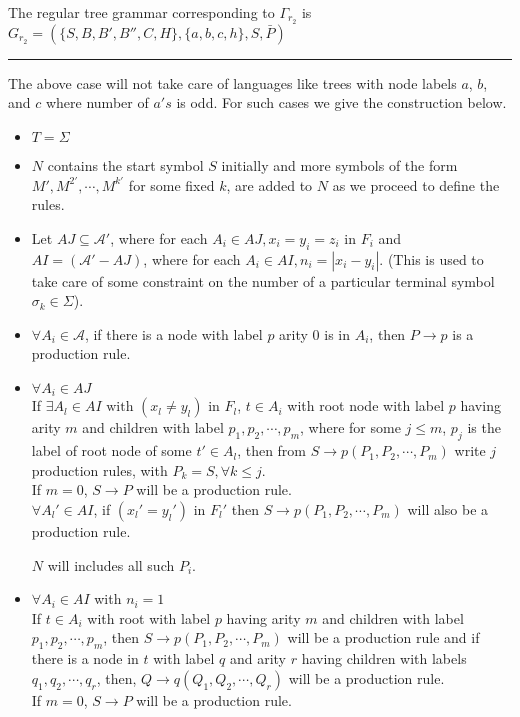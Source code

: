 \begin{example}
   The regular tree grammar corresponding to $\Gamma _{r_2}$ is    $G_{r_2}=(\{S,B,B',B'',C,H\},\{a,b,c,h\},S,\bar{P})$\\
\noindent \rule{\textwidth}{1pt}
\end{example}    


The above case will not take care of languages like trees with node labels $a$, $b$, and $c$ where number of $a's$ is odd. For such cases we 
give the construction below.
\begin{itemize}
	\item $T=\Sigma$
	\item $N$ contains the start symbol  $S$ initially and more symbols of the form $M',M^{2'},\cdots , M^{k'}$ for some fixed $k$, are added to $N$ 
		as we proceed to define the rules. 
	\item Let $AJ\subseteq \mathcal{A}'$, where for each $A_i \in AJ, x_i=y_i=z_i \mbox{ in }F_i$ and 
		$AI= (\mathcal{A}'-AJ)$, where for each $A_i\in AI,$\hbox{$ n_i=|x_i-y_i|.$} (This is used to take care of some constraint on the number of 
		a particular terminal symbol $\sigma_k\in \Sigma$).
	\item $\forall A_i\in \mathcal{A}$, if there is a node with label $p$ arity 0 is in $A_i$, then \hbox{$P\rightarrow p$} is a production rule.
	\item $\forall A_i\in AJ$\\
		If  $\exists A_l\in AI\mbox{ with }(x_l\neq y_l)\mbox{ in } F_l$, $t\in A_i$ with root node with label $p$ 
		having arity $m$ and children with label 
		$p_1,p_2,\cdots ,p_{m}$, where for  some $j\leq m$, $p_j$ is the label of root node of some $t'\in A_l$, then from 
		\hbox{$S\rightarrow p(P_1,P_2,\cdots ,P_m)$}  write  $j$ production rules, with $P_k=S,\forall k\leq j$.\\
		If $m=0$, \hbox{$S\rightarrow P$} will be a production rule.\\

		$\forall A_l'\in AI$, if $(x_l'= y_l')\mbox{ in }F_l'$ then \hbox{$S\rightarrow p(P_1,P_2,\cdots ,P_m)$} will also be a production rule.

		$N$ will includes all such $P_i$.

	\item $\forall A_i\in AI$ with $n_i=1$\\
		If $t\in A_i$ with root with label $p$ having arity $m$ and children with label $p_1,p_2,\cdots ,p_m$, 
		then \hbox{$S\rightarrow p(P_1,P_2,\cdots ,P_m)$} 
		will be a production rule and  if there is a node in $t$ with label $q$ and arity $r$  having children with labels $q_1,q_2,\cdots ,q_r$,
		then, \hbox{$Q\rightarrow q(Q_1,Q_2,\cdots ,Q_r)$} will be a production rule.\\If $m=0$, \hbox{$S\rightarrow P$} will be a production rule.
				

\end{itemize}

